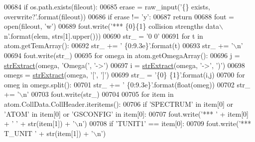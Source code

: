 \begin{DoxyCode}
00684         \textcolor{keywordflow}{if} os.path.exists(fileout):
00685             erase = raw\_input(\textcolor{stringliteral}{'\{\} exists, overwrite?'}.format(fileout))
00686             \textcolor{keywordflow}{if} erase != \textcolor{stringliteral}{'y'}:
00687                 \textcolor{keywordflow}{return}
00688     fout = open(fileout, \textcolor{stringliteral}{'w'})
00689     fout.write(\textcolor{stringliteral}{'*** \{0\}\{1\} collision strengths data\(\backslash\)n'}.format(elem, strs[1].upper()))
00690     str\_ = \textcolor{stringliteral}{'0 0'}
00691     \textcolor{keywordflow}{for} t \textcolor{keywordflow}{in} atom.getTemArray():
00692         str\_ += \textcolor{stringliteral}{' \{0:9.3e\}'}.format(t)
00693     str\_ += \textcolor{stringliteral}{'\(\backslash\)n'}
00694     fout.write(str\_)
00695     \textcolor{keywordflow}{for} omega \textcolor{keywordflow}{in} atom.getOmegaArray():
00696         j = \hyperlink{namespacepyneb_1_1utils_1_1misc_aaf9c5249e3c3104e38854ca30f9df4b7}{strExtract}(omega, \textcolor{stringliteral}{'Omega('}, \textcolor{stringliteral}{'->'})
00697         i = \hyperlink{namespacepyneb_1_1utils_1_1misc_aaf9c5249e3c3104e38854ca30f9df4b7}{strExtract}(omega, \textcolor{stringliteral}{'->'}, \textcolor{stringliteral}{')'})
00698         omegs = \hyperlink{namespacepyneb_1_1utils_1_1misc_aaf9c5249e3c3104e38854ca30f9df4b7}{strExtract}(omega, \textcolor{stringliteral}{'['}, \textcolor{stringliteral}{']'})
00699         str\_ = \textcolor{stringliteral}{'\{0\} \{1\}'}.format(i,j)
00700         \textcolor{keywordflow}{for} omeg \textcolor{keywordflow}{in} omegs.split():
00701             str\_ += \textcolor{stringliteral}{' \{0:9.3e\}'}.format(float(omeg))
00702         str\_ += \textcolor{stringliteral}{'\(\backslash\)n'}
00703         fout.write(str\_)
00704         
00705     \textcolor{keywordflow}{for} item \textcolor{keywordflow}{in} atom.CollData.CollHeader.iteritems():
00706         \textcolor{keywordflow}{if} \textcolor{stringliteral}{'SPECTRUM'} \textcolor{keywordflow}{in} item[0] \textcolor{keywordflow}{or} \textcolor{stringliteral}{'ATOM'} \textcolor{keywordflow}{in} item[0] \textcolor{keywordflow}{or} \textcolor{stringliteral}{'GSCONFIG'} \textcolor{keywordflow}{in} item[0]:
00707             fout.write(\textcolor{stringliteral}{'*** '} + item[0] + \textcolor{stringliteral}{' '} + str(item[1]) + \textcolor{stringliteral}{'\(\backslash\)n'})
00708         \textcolor{keywordflow}{if} \textcolor{stringliteral}{'TUNIT1'} == item[0]:
00709             fout.write(\textcolor{stringliteral}{'*** T\_UNIT '} + str(item[1]) + \textcolor{stringliteral}{'\(\backslash\)n'}) 

\end{DoxyCode}
